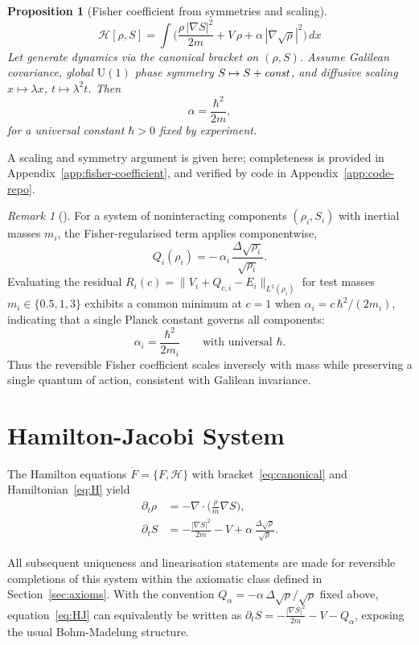 \documentclass[11pt,a4paper]{article}
\numberwithin{equation}{section}
\theoremstyle{thmcompact}
\newtheorem{proposition}[theorem]{Proposition}
\theoremstyle{remark}
\newtheorem*{remarkplain}{Remark}
\newenvironment{remark}[1][]%
{\begin{remarkbox}\begin{remarkplain}[#1]\normalfont}
		{\end{remarkplain}\end{remarkbox}}
\begin{document}
\begin{proposition}[Fisher coefficient from symmetries and scaling]
	
	\[
	\mathcal H[\rho,S]
	=\int\!\Big(\frac{\rho\,|\nabla S|^{2}}{2m}+V\,\rho+\alpha\,|\nabla\sqrt{\rho}|^{2}\Big)\,dx
	\]
	Let generate dynamics via the canonical bracket on $(\rho,S)$. Assume Galilean covariance, global $\mathrm{U}(1)$ phase symmetry $S\mapsto S+\text{\emph{const}}$, and diffusive scaling $x\mapsto\lambda x$, $t\mapsto\lambda^{2}t$. Then
	\[
	\alpha=\frac{\hbar^{2}}{2m},
	\]
	for a universal constant $\hbar>0$ fixed by experiment.
\end{proposition}

A scaling and symmetry argument is given here; completeness is provided in Appendix~\ref{app:fisher-coefficient}, and verified by code in Appendix~\ref{app:code-repo}.

\begin{remark}
	For a system of noninteracting components $(\rho_i,S_i)$ with inertial masses $m_i$, the Fisher-regularised term applies componentwise,
	\[
	Q_i(\rho_i)=-\,\alpha_i\,\frac{\Delta\sqrt{\rho_i}}{\sqrt{\rho_i}}.
	\]
	Evaluating the residual
	\(
	R_i(c)=\|V_i+Q_{c,i}-E_i\|_{L^{2}(\rho_i)}
	\)
	for test masses $m_i\in\{0.5,1,3\}$ exhibits a common minimum at $c=1$ when $\alpha_i=c\,\hbar^{2}/(2m_i)$, indicating that a single Planck constant governs all components:
	\[
	\alpha_i=\frac{\hbar^{2}}{2m_i}\qquad\text{with universal }\hbar.
	\]
	Thus the reversible Fisher coefficient scales inversely with mass while preserving a single quantum of action, consistent with Galilean invariance.
\end{remark}
	
\section{Hamilton-Jacobi System}
	
	The Hamilton equations $\dot F=\{F,\mathcal H\}$ with bracket~\eqref{eq:canonical} and Hamiltonian~\eqref{eq:H} yield
\begin{align}
	\partial_t \rho &= -\nabla\!\cdot\!\Big(\frac{\rho}{m}\nabla S\Big),
	\label{eq:continuity}\\
	\partial_t S &= -\frac{|\nabla S|^2}{2m}-V
	+\alpha\,\frac{\Delta\sqrt\rho}{\sqrt\rho}.
	\label{eq:HJ}
\end{align}

All subsequent uniqueness and linearisation statements are made for reversible completions of this system within the axiomatic class defined in Section~\ref{sec:axioms}. With the convention $Q_\alpha=-\alpha\,\Delta\sqrt{\rho}/\sqrt{\rho}$ fixed above, equation~\eqref{eq:HJ} can equivalently be written as $\partial_t S = -\frac{|\nabla S|^2}{2m}-V - Q_\alpha$, exposing the usual Bohm-Madelung structure.
\end{document}
